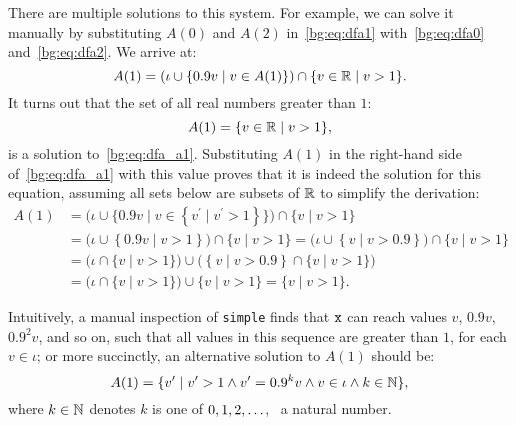 There are multiple solutions to this system.  For example, we can solve
it manually by substituting $A(0)$ and $A(2)$ in~\eqref{bg:eq:dfa1}
with~\eqref{bg:eq:dfa0} and~\eqref{bg:eq:dfa2}.  We arrive at:
\begin{equation}
    A(1) = \left(
        \iota \cup \left\{ 0.9 v \mid v \in A(1) \right\}
    \right) \cap \{ v \in \mathbb{R} \mid v > 1 \}.
    \label{bg:eq:dfa_a1}
\end{equation}
It turns out that the set of all real numbers greater than $1$:
\begin{equation}
    A(1) = \{ v \in \mathbb{R} \mid v > 1 \},
    \label{bg:eq:a11}
\end{equation}
is a solution to~\eqref{bg:eq:dfa_a1}.  Substituting $A(1)$ in the right-hand
side of~\eqref{bg:eq:dfa_a1} with this value proves that it is indeed the
solution for this equation, assuming all sets below are subsets of $\mathbb{R}$
to simplify the derivation:
\begin{equation}
    \begin{aligned}
        A(1)
        &= \bigg( \iota \cup \Big\{ 0.9 v \mid v \in
                \left\{ v^\prime \mid v^\prime > 1 \right\}
           \Big\} \bigg) \cap \{ v \mid v > 1 \} \\
        &= \bigg( \iota \cup \left\{ 0.9 v \mid v > 1 \right\} \bigg) \cap
           \{ v \mid v > 1 \}
         = \bigg( \iota \cup \left\{ v \mid v > 0.9 \right\} \bigg) \cap
           \{ v \mid v > 1 \} \\
        &= \bigg( \iota \cap \{ v \mid v > 1 \} \bigg) \cup
           \bigg(
               \left\{ v \mid v > 0.9 \right\} \cap \{ v  \mid v > 1 \}
           \bigg) \\
        &= \bigg( \iota \cap \{ v \mid v > 1 \} \bigg) \cup
           \{ v \mid v > 1 \}
         = \{ v \mid v > 1 \}.
    \end{aligned}
\end{equation}

Intuitively, a manual inspection of \verb|simple| finds that $\texttt{x}$ can
reach values $v$, $0.9 v$, $0.9^2 v$, and so on, such that all values in this
sequence are greater than $1$, for each $v \in \iota$; or more succinctly, an
alternative solution to $A(1)$ should be:
\begin{equation}
    A(1) = \{ v^\prime \mid
        v^\prime > 1 \wedge
        v^\prime = 0.9^k v \wedge
        v \in \iota \wedge
        k \in \mathbb{N}
    \},
    \label{bg:eq:a12}
\end{equation}
where $k \in \mathbb{N}$ denotes $k$ is one of $0, 1, 2, \mathellipsis$, \ie~a
natural number.

